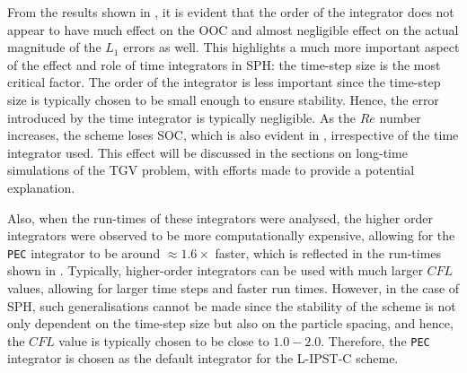 From the results shown in , it is evident that the order of the integrator does not appear to have much effect on the OOC and almost negligible effect on the actual magnitude of the $L_1$ errors as well.
This highlights a much more important aspect of the effect and role of time integrators in SPH: the time-step size is the most critical factor. The order of the integrator is less important since the time-step size is typically chosen to be small enough to ensure stability. Hence, the error introduced by the time integrator is typically negligible.
As the $Re$ number increases, the scheme loses SOC, which is also evident in , irrespective of the time integrator used. This effect will be discussed in the sections on long-time simulations of the TGV problem, with efforts made to provide a potential explanation.

Also, when the run-times of these integrators were analysed, the higher order integrators were observed to be more computationally expensive, allowing for the \texttt{PEC} integrator to be around $\approx 1.6\times$ faster, which is reflected in the run-times shown in .
Typically, higher-order integrators can be used with much larger $CFL$ values, allowing for larger time steps and faster run times. However, in the case of SPH, such generalisations cannot be made since the stability of the scheme is not only dependent on the time-step size but also on the particle spacing, and hence, the $CFL$ value is typically chosen to be close to $1.0-2.0$.
Therefore, the \texttt{PEC} integrator is chosen as the default integrator for the L-IPST-C scheme.


